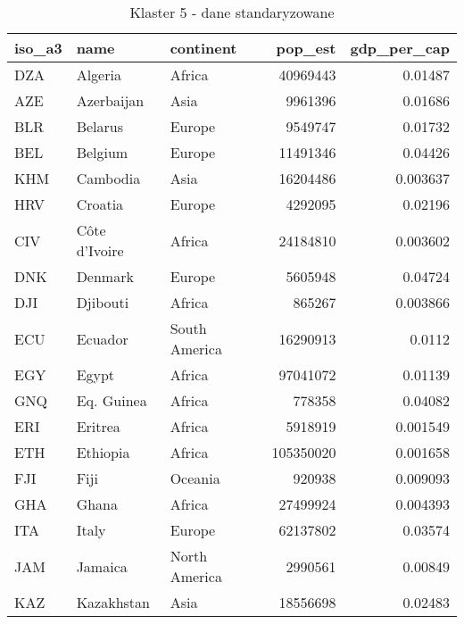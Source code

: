 \begin{table}[h!]
    \centering
    \caption{Klaster 5 - dane standaryzowane}
    \label{tab:cl5std}
    \begin{tabular}{lllrr}
        \toprule
        iso\_a3 & name          & continent     & pop\_est  & gdp\_per\_cap \\
        \midrule
        DZA     & Algeria       & Africa        & 40969443  & 0.01487       \\
        AZE     & Azerbaijan    & Asia          & 9961396   & 0.01686       \\
        BLR     & Belarus       & Europe        & 9549747   & 0.01732       \\
        BEL     & Belgium       & Europe        & 11491346  & 0.04426       \\
        KHM     & Cambodia      & Asia          & 16204486  & 0.003637      \\
        HRV     & Croatia       & Europe        & 4292095   & 0.02196       \\
        CIV     & Côte d'Ivoire & Africa        & 24184810  & 0.003602      \\
        DNK     & Denmark       & Europe        & 5605948   & 0.04724       \\
        DJI     & Djibouti      & Africa        & 865267    & 0.003866      \\
        ECU     & Ecuador       & South America & 16290913  & 0.0112        \\
        EGY     & Egypt         & Africa        & 97041072  & 0.01139       \\
        GNQ     & Eq. Guinea    & Africa        & 778358    & 0.04082       \\
        ERI     & Eritrea       & Africa        & 5918919   & 0.001549      \\
        ETH     & Ethiopia      & Africa        & 105350020 & 0.001658      \\
        FJI     & Fiji          & Oceania       & 920938    & 0.009093      \\
        GHA     & Ghana         & Africa        & 27499924  & 0.004393      \\
        ITA     & Italy         & Europe        & 62137802  & 0.03574       \\
        JAM     & Jamaica       & North America & 2990561   & 0.00849       \\
        KAZ     & Kazakhstan    & Asia          & 18556698  & 0.02483       \\

\end{tabular}
\end{table}
